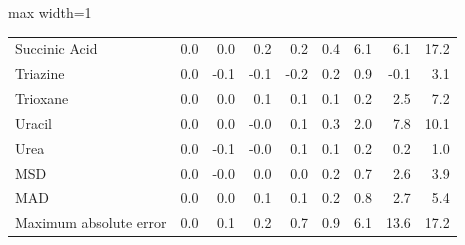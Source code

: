 \begin{table}[h]
\begin{adjustbox}{max width=1\textwidth}
\begin{tabular}{lrrrrrrrr}
Succinic Acid & 0.0 & 0.0 & 0.2 & 0.2 & 0.4 & 6.1 & 6.1 & 17.2 \\
Triazine & 0.0 & -0.1 & -0.1 & -0.2 & 0.2 & 0.9 & -0.1 & 3.1 \\
Trioxane & 0.0 & 0.0 & 0.1 & 0.1 & 0.1 & 0.2 & 2.5 & 7.2 \\
Uracil & 0.0 & 0.0 & -0.0 & 0.1 & 0.3 & 2.0 & 7.8 & 10.1 \\
Urea & 0.0 & -0.1 & -0.0 & 0.1 & 0.1 & 0.2 & 0.2 & 1.0 \\
MSD & 0.0 & -0.0 & 0.0 & 0.0 & 0.2 & 0.7 & 2.6 & 3.9 \\
MAD & 0.0 & 0.0 & 0.1 & 0.1 & 0.2 & 0.8 & 2.7 & 5.4 \\
Maximum absolute error & 0.0 & 0.1 & 0.2 & 0.7 & 0.9 & 6.1 & 13.6 & 17.2 \\
\bottomrule
\end{tabular}
\end{adjustbox}

\end{table}